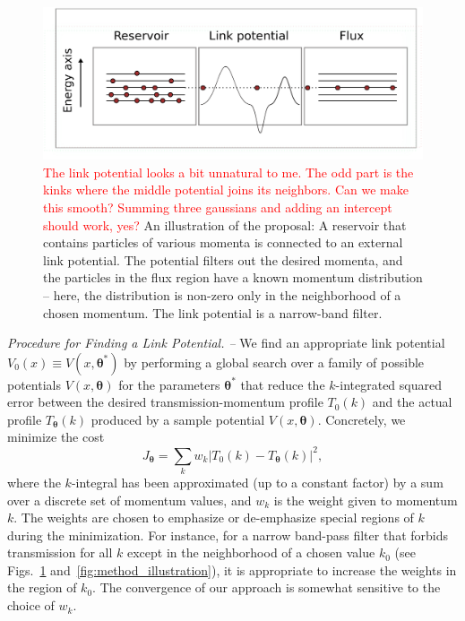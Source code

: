 \documentclass[twocolumn,amsmath,amssymb,showpacs,prl,superscriptaddress,aps]{revtex4-1}
\begin{document}
\begin{figure}
\centerline{\includegraphics[scale=0.3]{figure1new.pdf}}
\caption{ \textcolor{red}{The link potential looks a bit unnatural to me. The odd part is the kinks where the middle potential joins its neighbors. Can we make this smooth? Summing three gaussians and adding an intercept should work, yes?} An illustration of the proposal: A reservoir that contains particles of various momenta is connected to an external link potential. The potential filters out the desired momenta, and the particles in the flux region have a known momentum distribution -- here, the distribution is non-zero only in the neighborhood of a chosen momentum. The link potential is a narrow-band filter.
}
\label{fig:Figure1}
\end{figure}

{\it Procedure for Finding a Link Potential. --} 
We find an appropriate link potential $V_0(x) \equiv V(x,\bm{\theta}^*)$ by performing a global search over a family of possible potentials $V(x,\bm{\theta})$ for the parameters $\bm{\theta}^*$ that reduce the $k$-integrated squared error between the desired transmission-momentum profile $T_0(k)$ and the actual profile $T_{\bm\theta}(k)$ produced by a sample potential $V(x, \bm{\theta})$. Concretely, we minimize the cost
\begin{equation}\label{eq:cost1}
  J_{\bm{\theta}} = \sum_kw_k\left|T_0(k) - T_{\bm{\theta}}(k)\right|^2,
\end{equation}
where the $k$-integral has been approximated (up to a constant factor) by a sum over a discrete set of momentum values, and $w_k$ is the weight given to momentum $k$. The weights are chosen to emphasize or de-emphasize special regions of $k$ during the minimization. For instance, for a narrow band-pass filter that forbids transmission for all $k$ except in the neighborhood of a chosen value $k_0$ (see Figs.~\ref{fig:Figure1} and~\ref{fig:method_illustration}), it is appropriate to increase the weights in the region of $k_0$. The convergence of our approach is somewhat sensitive to the choice of $w_k$.
\end{document}
